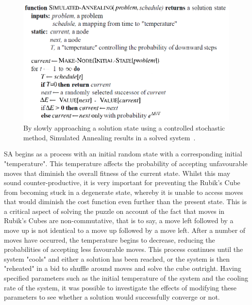\documentclass[UKenglish]{svproc}
\begin{document}
\begin{figure}[!h]
\begin{small}
\centering
\linespread{1.0}
\includegraphics[width=0.75\linewidth]{images/simulated annealing}
\caption{By slowly approaching a solution state using a controlled stochastic method, Simulated Annealing results in a solved system~\cite{10.5555/1671238}.}
\label{fig:fig1}
\end{small}
\end{figure}

SA begins as a process with an initial random state with a corresponding initial "temperature". This temperature affects the probability of accepting unfavourable moves that diminish the overall fitness of the current state. Whilst this may sound counter-productive, it is very important for preventing the Rubik's Cube from becoming stuck in a degenerate state, whereby it is unable to access moves that would diminish the cost function even further than the present state. This is a critical aspect of solving the puzzle on account of the fact that moves in Rubik's Cubes are non-commutative, that is to say, a move left followed by a move up is not identical to a move up followed by a move left. After a number of moves have occurred, the temperature begins to decrease, reducing the probabilities of accepting less favourable moves. This process continues until the system "cools" and either a solution has been reached, or the system is then "reheated" in a bid to shuffle around moves and solve the cube outright. Having specified parameters such as the initial temperature of the system and the cooling rate of the system, it was possible to investigate the effects of modifying these parameters to see whether a solution would successfully converge or not.

\end{document}
